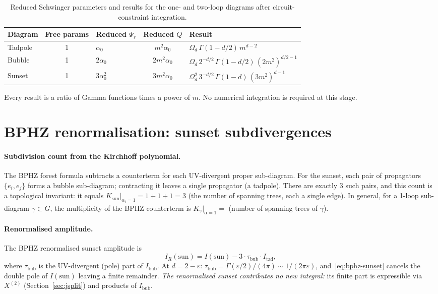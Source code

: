 \documentclass[10pt,a4paper,twocolumn]{article}
\theoremstyle{plain}
\theoremstyle{definition}
\renewcommand{\Psi}{\varPsi}
\newcommand{\eps}{\varepsilon}
\begin{document}
\begin{table}[t]
\centering
\renewcommand{\arraystretch}{1.3}
\begin{tabular}{lclcl}
\toprule
Diagram & Free params & Reduced $\Psi_r$ & Reduced $Q$ & Result \\
\midrule
Tadpole  & 1 & $\alpha_0$ & $m^2\alpha_0$ &
  $\Omega_d\,\Gamma(1-d/2)\,m^{d-2}$ \\
Bubble   & 1 & $2\alpha_0$ & $2m^2\alpha_0$ &
  $\Omega_d\,2^{-d/2}\,\Gamma(1-d/2)\,(2m^2)^{d/2-1}$ \\
Sunset   & 1 & $3\alpha_0^2$ & $3m^2\alpha_0$ &
  $\Omega_d^2\,3^{-d/2}\,\Gamma(1-d)\,(3m^2)^{d-1}$ \\
\bottomrule
\end{tabular}
\caption{Reduced Schwinger parameters and results for the
  one- and two-loop diagrams after circuit-constraint integration.}
\label{tab:schwinger}
\end{table}

\smallskip\noindent
Every result is a ratio of Gamma functions times a power of $m$.
No numerical integration is required at this stage.

\section{BPHZ renormalisation: sunset subdivergences}
\label{sec:bphz}

\paragraph{Subdivision count from the Kirchhoff polynomial.}
The BPHZ forest formula subtracts a counterterm for each UV-divergent
proper sub-diagram.  For the sunset, each pair of propagators
$\{e_i, e_j\}$ forms a bubble sub-diagram; contracting it leaves
a single propagator (a tadpole).  There are exactly 3 such pairs,
and this count is a topological invariant: it equals
$K_{\text{sun}}\big|_{\alpha_i=1} = 1+1+1 = 3$
(the number of spanning trees, each a single edge).
In general, for a 1-loop sub-diagram $\gamma \subset G$, the
multiplicity of the BPHZ counterterm is
$K_\gamma\!\big|_{\alpha=1} = $ (number of spanning trees of $\gamma$).

\paragraph{Renormalised amplitude.}
The BPHZ renormalised sunset amplitude is
\begin{equation}\label{eq:bphz-sunset}
  I_R(\text{sun})
  = I(\text{sun})
    - 3\cdot\tau_{\text{bub}}\cdot I_{\text{tad}},
\end{equation}
where $\tau_{\text{bub}}$ is the UV-divergent (pole) part of
$I_{\text{bub}}$.  At $d=2-\eps$:
$\tau_{\text{bub}} = \Gamma(\eps/2)/(4\pi) \sim 1/(2\pi\eps)$,
and~\eqref{eq:bphz-sunset} cancels the double pole of $I(\text{sun})$
leaving a finite remainder.  \emph{The renormalised sunset contributes
no new integral:} its finite part is expressible via $X^{(2)}$
(Section~\ref{sec:jsplit}) and products of $I_{\text{bub}}$.
\end{document}
